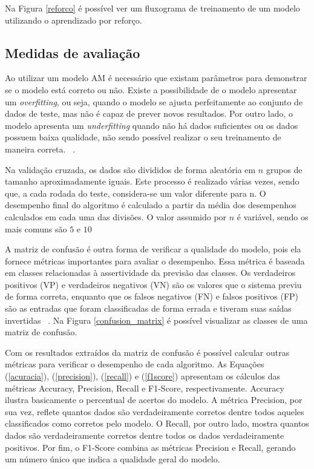           Na Figura \ref{reforco} é possível ver um fluxograma de treinamento de um modelo utilizando o aprendizado por reforço.


  \subsection{Medidas de avaliação}
          Ao utilizar um modelo \acrshort{AM} é necessário que existam parâmetros para demonstrar se o modelo está correto ou não. Existe a possibilidade de o modelo apresentar
           um \textit{overfitting}, ou seja, quando o modelo se ajusta perfeitamente ao conjunto de dados de teste, mas não é capaz de prever novos resultados. 
           Por outro lado, o modelo apresenta um \textit{underfitting} quando não há dados suficientes ou os dados possuem baixa qualidade, não sendo possível realizar o 
           seu treinamento de maneira correta. ~\cite{van2010process}.
          
          Na validação cruzada, os dados são divididos de forma aleatória em $n$ grupos de tamanho aproximadamente iguais. Este processo é realizado várias vezes, sendo que, a cada rodada do teste, considera-se um valor diferente para n. O desempenho final do algoritmo é calculado a partir da média dos desempenhos calculados em cada uma das divisões. O valor assumido por $n$ é variável, sendo os mais comuns são $5$ e $10$~\cite{kohavi1995study}


          A matriz de confusão é outra forma de verificar a qualidade do modelo, pois ela fornece métricas importantes 
          para avaliar o desempenho. Essa métrica é baseada em classes relacionadas à assertividade da previsão das classes. Os verdadeiros positivos  (VP) e verdadeiros negativos (VN)
          são os valores que o sistema previu de forma correta, enquanto que os falsos negativos (FN) e falsos positivos (FP)  são 
          as entradas que foram classificadas de forma errada e tiveram suas saídas invertidas ~\cite{martin}. Na Figura \ref{confusion_matrix} é possível visualizar
          as classes de uma matriz de confusão.




          Com os resultados extraídos da matriz de confusão é possível calcular outras métricas para verificar o desempenho de cada algoritmo. As Equações (\ref{acuracia}), (\ref{precision}), (\ref{recall}) e (\ref{f1score}) apresentam os cálculos das métricas Accuracy, Precision, Recall e F1-Score, respectivamente. 
          Accuracy ilustra basicamente o percentual de acertos do modelo. A métrica Precision, por sua vez, reflete quantos dados são verdadeiramente corretos 
          dentre todos aqueles classificados como corretos pelo modelo. O Recall, por outro lado, mostra quantos dados são verdadeiramente corretos
           dentre todos os dados verdadeiramente positivos. Por fim, o F1-Score combina as métricas Precision e Recall, gerando um número único que indica a qualidade geral do modelo.


